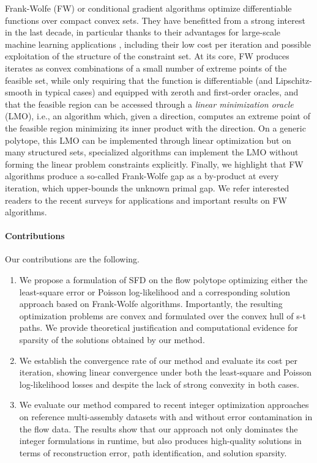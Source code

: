 \documentclass{ecai}
\begin{document}
Frank-Wolfe (FW) or conditional gradient algorithms \cite{frank1956algorithm,levitin1966constrained} optimize differentiable functions over compact convex sets.
They have benefitted from a strong interest in the last decade, in particular thanks to their advantages for large-scale machine learning applications \cite{jaggi2013revisiting},
including their low cost per iteration and possible exploitation of the structure of the constraint set.
At its core, FW produces iterates as convex combinations of a small number of extreme points of the feasible set,
while only requiring that the function is differentiable (and Lipschitz-smooth in typical cases)
and equipped with zeroth and first-order oracles, and that the feasible region can be accessed through a \emph{linear minimization oracle} (LMO),
i.e., an algorithm which, given a direction, computes an extreme point of the feasible region minimizing its inner product with the direction.
On a generic polytope, this LMO can be implemented through linear optimization but on many structured sets, specialized algorithms can implement the LMO without forming the linear problem constraints explicitly.
Finally, we highlight that FW algorithms produce a so-called Frank-Wolfe gap as a by-product at every iteration, which upper-bounds the unknown primal gap.
We refer interested readers to the recent surveys \cite{bomze2021frank,braun2022conditional} for applications and important results on FW algorithms.

\paragraph*{Contributions\\}

Our contributions are the following.
\begin{enumerate}
    \item We propose a formulation of SFD on the flow polytope optimizing either the least-square error or Poisson log-likelihood and a corresponding solution approach based on Frank-Wolfe algorithms. Importantly, the resulting optimization problems are convex and formulated over the convex hull of s-t paths. We provide theoretical justification and computational evidence for sparsity of the solutions obtained by our method.
    \item We establish the convergence rate of our method and evaluate its cost per iteration, showing linear convergence under both the least-square and Poisson log-likelihood losses and despite the lack of strong convexity in both cases.
    \item We evaluate our method compared to recent integer optimization approaches on reference multi-assembly datasets with and without error contamination in the flow data.
 The results show that our approach not only dominates the integer formulations in runtime, but also produces high-quality solutions in terms of reconstruction error, path identification, and solution sparsity.
\end{enumerate}
\end{document}

